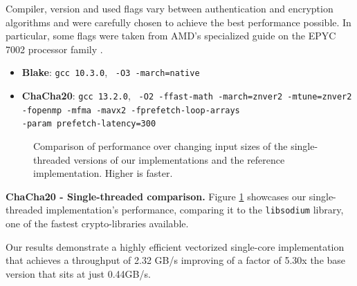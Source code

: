 \documentclass[letterpaper]{article}
\newcommand{\mypar}[1]{{\bf #1.}}
\begin{document}
Compiler, version and used flags vary between authentication and encryption algorithms and were carefully chosen to achieve the best performance possible. In particular, some flags were taken from AMD's specialized guide on the EPYC 7002 processor family \cite{amd}.
\begin{itemize}
    \item \textbf{Blake}: \texttt{gcc 10.3.0}, \texttt{ -O3 -march=native}
    \item \textbf{ChaCha20}: \texttt{gcc 13.2.0}, \texttt{ -O2 -ffast-math -march=znver2 -mtune=znver2 -fopenmp -mfma -mavx2 -fprefetch-loop-arrays \\-param prefetch-latency=300}
\end{itemize}


\begin{figure}
\centering
	
	\caption{Comparison of performance over changing input sizes of the single-threaded versions of our implementations and the reference implementation. Higher is faster.
  \label{fig:enc_single_thread}}
  \vspace{-4pt}
\end{figure}

\mypar{ChaCha20 - Single-threaded comparison}
Figure \ref{fig:enc_single_thread} showcases our single-threaded implementation's performance, comparing it to the \texttt{libsodium} library, one of the fastest crypto-libraries available.

Our results demonstrate a highly efficient vectorized single-core implementation that achieves a throughput of 2.32 GB/s improving of a factor of 5.30x the base version that sits at just 0.44GB/s.
\end{document}
